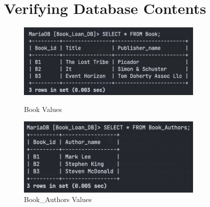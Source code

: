 \documentclass{article}
\begin{document}
\newpage
\section{Verifying Database Contents}

\begin{figure}[h!]
    \begin{minipage}[b]{0.5\linewidth}
        \centering
        \includegraphics[width=0.8\textwidth]{images/table-book-entries.png}
        \caption{Book Values}
        \label{fig:table-book}
    \end{minipage}
    \hspace{0.5cm}
    \begin{minipage}[b]{0.5\linewidth}
        \centering
        \includegraphics[width=0.8\textwidth]{images/table-book-authors-entries.png}
        \caption{Book\_Authors Values}
        \label{fig:table-book-authors}
    \end{minipage}
\end{figure}
\end{document}
